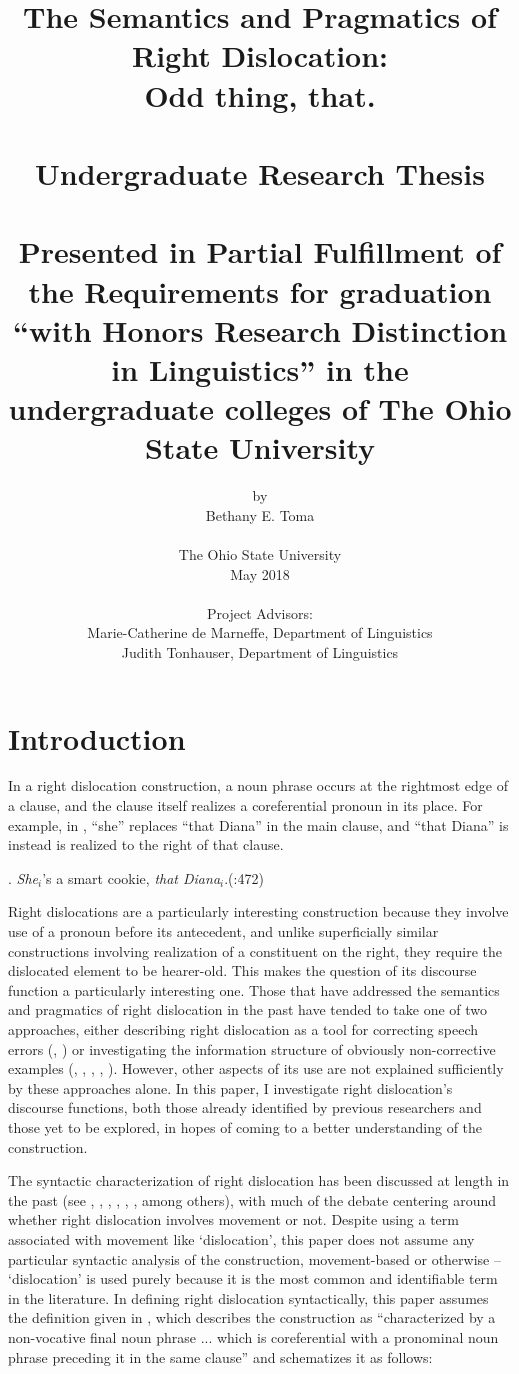 \documentclass[titlepage,12pt]{article}
\title{
    {The Semantics and Pragmatics of Right Dislocation:\\Odd thing, that.}\\\hfill\\{\large Undergraduate Research Thesis}\\\hfill\\{\large Presented in Partial Fulfillment of the Requirements for graduation ``with Honors Research Distinction in Linguistics'' in the undergraduate colleges of The Ohio State University}
}
\author{{by}\\{Bethany E. Toma}\\\hfill\\{The Ohio State University}\\{May 2018}\\\hfill\\Project Advisors:\\Marie-Catherine de Marneffe, Department of Linguistics\\Judith Tonhauser, Department of Linguistics
}
\date{}
\begin{document}
\maketitle

\section{Introduction}

In a right dislocation construction, a noun phrase occurs at the rightmost edge of a clause, and the clause itself realizes a coreferential pronoun in its place. For example, in \Next, ``she'' replaces ``that Diana'' in the main clause, and ``that Diana'' is instead is realized to the right of that clause.

\ex. \textit{She}$_i$'s a smart cookie, \textit{that Diana}$_i$.\hfill (\citealt{ward_discourse_1996}:472)

Right dislocations are a particularly interesting construction because they involve use of a pronoun before its antecedent, and unlike superficially similar constructions involving realization of a constituent on the right, they require the dislocated element to be hearer-old. This makes the question of its discourse function a particularly interesting one. Those that have addressed the semantics and pragmatics of right dislocation in the past have tended to take one of two approaches, either describing right dislocation as a tool for correcting speech errors (\citealt{tomlin_basic_1986}, \citealt{geluykens_tails_1987}) or investigating the information structure of obviously non-corrective examples (\citealt{ziv_left_1994}, \citealt{ziv_right_1994}, \citealt{ward_discourse_1996}, \citealt{grosz_centering_1998}, \citealt{lambrecht_information_2000}). However, other aspects of its use are not explained sufficiently by these approaches alone. In this paper, I investigate right dislocation's discourse functions, both those already identified by previous researchers and those yet to be explored, in hopes of coming to a better understanding of the construction.

The syntactic characterization of right dislocation has been discussed at length in the past (see \citealt{kayne_antisymmetry_1994}, \citealt{cecchetto1999comparative}, \citealt{tanaka_2001}, \citealt{de_cat_french_2007}, \citealt{kamada2009rightward}, \citealt{ott_right-dislocation_2016}, among others), with much of the debate centering around whether right dislocation involves movement or not. Despite using a term associated with movement like `dislocation', this paper does not assume any particular syntactic analysis of the construction, movement-based or otherwise -- `dislocation' is used purely because it is the most common and identifiable term in the literature. In defining right dislocation syntactically, this paper assumes the definition given in \citealt{grosz_centering_1998}, which describes the construction as ``characterized by a non-vocative final noun phrase ... which is coreferential with a pronominal noun phrase preceding it in the same clause'' and schematizes it as follows: 
\end{document}
